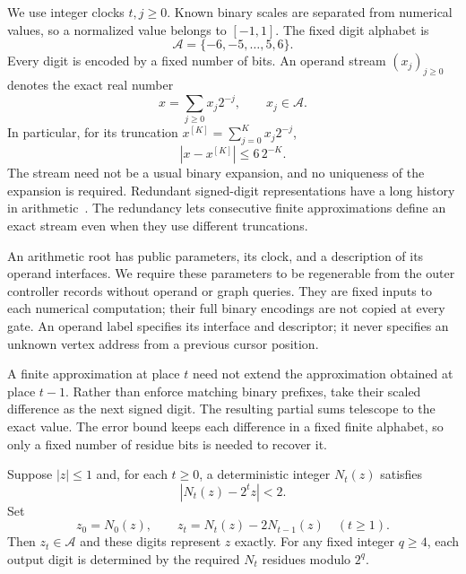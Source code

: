 We use integer clocks $t,j\geq 0$.  Known binary scales are separated
from numerical values, so a normalized value belongs to $[-1,1]$.
The fixed digit alphabet is
\[
 \mathcal A=\{-6,-5,\ldots,5,6\}.
\]
Every digit is encoded by a fixed number of bits.  An operand stream
$(x_j)_{j\geq0}$ denotes the exact real number
\begin{equation}
 x=\sum_{j\geq0}x_j2^{-j},\qquad x_j\in\mathcal A.
 \label{eq:arith-stream}
\end{equation}
In particular, for its truncation $x^{[K]}=\sum_{j=0}^Kx_j2^{-j}$,
\begin{equation}
 |x-x^{[K]}|\leq 6\,2^{-K}.
 \label{eq:arith-tail}
\end{equation}
The stream need not be a usual binary expansion, and no uniqueness
of the expansion is required.
Redundant signed-digit representations have a long history in
arithmetic~\cite{Avizienis1963}.  The redundancy lets consecutive
finite approximations define an exact stream even when they use
different truncations.

An arithmetic root has public parameters, its clock, and a description
of its operand interfaces.  We require these parameters to be
regenerable from the outer controller records without operand or graph
queries.  They are fixed inputs to each numerical computation; their
full binary encodings are not copied at every gate.  An operand label
specifies its interface and descriptor; it never specifies an unknown
vertex address from a previous cursor position.

A finite approximation at place $t$ need not extend the approximation obtained at place $t-1$. Rather than enforce matching binary prefixes, take their scaled difference as the next signed digit. The resulting partial sums telescope to the exact value. The error bound keeps each difference in a fixed finite alphabet, so only a fixed number of residue bits is needed to recover it.

\begin{lemma}
\label{lem:arith-residue-stream}
Suppose $|z|\leq1$ and, for each $t\geq0$, a deterministic integer
$N_t(z)$ satisfies
\begin{equation}
 |N_t(z)-2^tz|<2.
 \label{eq:arith-approximation}
\end{equation}
Set
\begin{equation}
 z_0=N_0(z),\qquad z_t=N_t(z)-2N_{t-1}(z)\quad(t\geq1).
 \label{eq:arith-difference-digit}
\end{equation}
Then $z_t\in\mathcal A$ and these digits represent $z$ exactly.
For any fixed integer $q\geq4$, each output digit is determined by
the required $N_t$ residues modulo $2^q$.
\end{lemma}

